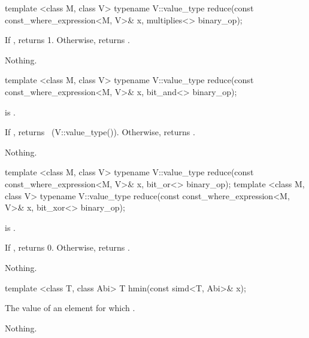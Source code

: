 \begin{itemdecl}
template <class M, class V>
typename V::value_type reduce(const const_where_expression<M, V>& x, multiplies<> binary_op);
\end{itemdecl}
\begin{itemdescr}
  \pnum\returns
  If , returns 1.
  Otherwise, returns  .

  \pnum\throws Nothing.
\end{itemdescr}

\begin{itemdecl}
template <class M, class V>
typename V::value_type reduce(const const_where_expression<M, V>& x, bit_and<> binary_op);
\end{itemdecl}
\begin{itemdescr}
  \pnum\requires {} is \true.

  \pnum\returns
  If , returns ~(V::value_type()).
  Otherwise, returns  .

  \pnum\throws Nothing.
\end{itemdescr}

\begin{itemdecl}
template <class M, class V>
typename V::value_type reduce(const const_where_expression<M, V>& x, bit_or<> binary_op);
template <class M, class V>
typename V::value_type reduce(const const_where_expression<M, V>& x, bit_xor<> binary_op);
\end{itemdecl}
\begin{itemdescr}
  \pnum\requires {} is \true.

  \pnum\returns
  If , returns 0.
  Otherwise, returns  .

  \pnum\throws Nothing.
\end{itemdescr}

\begin{itemdecl}
template <class T, class Abi> T hmin(const simd<T, Abi>& x);
\end{itemdecl}
\begin{itemdescr}
  \pnum\returns The value of an element  for which  \foralli.

  \pnum\throws Nothing.
\end{itemdescr}

